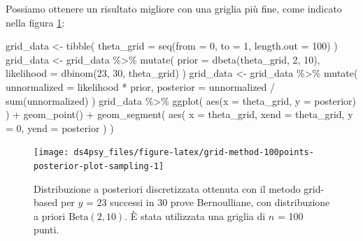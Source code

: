 \documentclass[
  11pt,
]{krantz}
\makeatletter
\newenvironment{Shaded}{\begin{snugshade}}{\end{snugshade}}
\newcommand{\AttributeTok}[1]{\textcolor[rgb]{0.61,0.61,0.61}{#1}}
\newcommand{\DecValTok}[1]{\textcolor[rgb]{0.06,0.06,0.06}{#1}}
\newcommand{\FunctionTok}[1]{\textcolor[rgb]{0,0,0}{#1}}
\newcommand{\NormalTok}[1]{#1}
\newcommand{\OtherTok}[1]{\textcolor[rgb]{0.37,0.37,0.37}{#1}}
\newcommand{\SpecialCharTok}[1]{\textcolor[rgb]{0,0,0}{#1}}
\newenvironment{kframe}{%
\medskip{}
\setlength{\fboxsep}{.8em}
 \def\at@end@of@kframe{}%
 \ifinner\ifhmode%
  \def\at@end@of@kframe{\end{minipage}}%
  \begin{minipage}{\columnwidth}%
 \fi\fi%
 \def\FrameCommand##1{\hskip\@totalleftmargin \hskip-\fboxsep
 \colorbox{shadecolor}{##1}\hskip-\fboxsep
     \hskip-\linewidth \hskip-\@totalleftmargin \hskip\columnwidth}%
 \MakeFramed {\advance\hsize-\width
   \@totalleftmargin\z@ \linewidth\hsize
   \@setminipage}}%
 {\par\unskip\endMakeFramed%
 \at@end@of@kframe}
\renewenvironment{Shaded}{\begin{kframe}}{\end{kframe}}
\theoremstyle{definition}
\theoremstyle{definition}
\theoremstyle{definition}
\theoremstyle{definition}
\theoremstyle{remark}
\makeatother
\begin{document}
Possiamo ottenere un risultato migliore con una griglia più fine, come indicato nella figura \ref{fig:grid-method-100points-posterior-plot-sampling}:

\begin{Shaded}
\begin{Highlighting}[]
\NormalTok{grid\_data }\OtherTok{\textless{}{-}} \FunctionTok{tibble}\NormalTok{(}
  \AttributeTok{theta\_grid =} \FunctionTok{seq}\NormalTok{(}\AttributeTok{from =} \DecValTok{0}\NormalTok{, }\AttributeTok{to =} \DecValTok{1}\NormalTok{, }\AttributeTok{length.out =} \DecValTok{100}\NormalTok{)}
\NormalTok{)}
\NormalTok{grid\_data }\OtherTok{\textless{}{-}}\NormalTok{ grid\_data }\SpecialCharTok{\%\textgreater{}\%}
  \FunctionTok{mutate}\NormalTok{(}
    \AttributeTok{prior =} \FunctionTok{dbeta}\NormalTok{(theta\_grid, }\DecValTok{2}\NormalTok{, }\DecValTok{10}\NormalTok{),}
    \AttributeTok{likelihood =} \FunctionTok{dbinom}\NormalTok{(}\DecValTok{23}\NormalTok{, }\DecValTok{30}\NormalTok{, theta\_grid)}
\NormalTok{  )}
\NormalTok{grid\_data }\OtherTok{\textless{}{-}}\NormalTok{ grid\_data }\SpecialCharTok{\%\textgreater{}\%}
  \FunctionTok{mutate}\NormalTok{(}
    \AttributeTok{unnormalized =}\NormalTok{ likelihood }\SpecialCharTok{*}\NormalTok{ prior,}
    \AttributeTok{posterior =}\NormalTok{ unnormalized }\SpecialCharTok{/} \FunctionTok{sum}\NormalTok{(unnormalized)}
\NormalTok{  )}
\NormalTok{grid\_data }\SpecialCharTok{\%\textgreater{}\%}
  \FunctionTok{ggplot}\NormalTok{(}
    \FunctionTok{aes}\NormalTok{(}\AttributeTok{x =}\NormalTok{ theta\_grid, }\AttributeTok{y =}\NormalTok{ posterior)}
\NormalTok{  ) }\SpecialCharTok{+}
  \FunctionTok{geom\_point}\NormalTok{() }\SpecialCharTok{+}
  \FunctionTok{geom\_segment}\NormalTok{(}
    \FunctionTok{aes}\NormalTok{(}
      \AttributeTok{x =}\NormalTok{ theta\_grid,}
      \AttributeTok{xend =}\NormalTok{ theta\_grid,}
      \AttributeTok{y =} \DecValTok{0}\NormalTok{,}
      \AttributeTok{yend =}\NormalTok{ posterior}
\NormalTok{    )}
\NormalTok{  )}
\end{Highlighting}
\end{Shaded}

\begin{figure}[h]

{\centering \texttt{[image: ds4psy\_files/figure-latex/grid-method-100points-posterior-plot-sampling-1]} 

}

\caption{Distribuzione a posteriori discretizzata ottenuta con il metodo grid-based per $y$ = 23 successi in 30 prove Bernoulliane, con distribuzione a priori $\mbox{Beta}(2, 10)$. È stata utilizzata una griglia di $n$ = 100 punti.}\label{fig:grid-method-100points-posterior-plot-sampling}
\end{figure}
\end{document}

